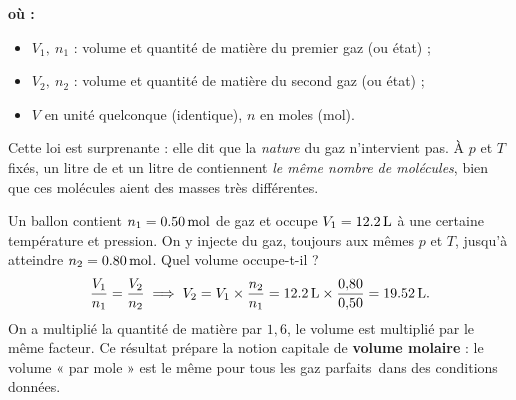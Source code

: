 \documentclass[11pt,a4paper]{article}
\newenvironment{ou}{%
  \par\smallskip\noindent\textbf{où :}\nopagebreak
  \begin{itemize}[leftmargin=1.8em,topsep=2pt,itemsep=1.5pt,parsep=0pt]}%
  {\end{itemize}}
\newcommand{\GP}{gaz parfaits}
\begin{document}
\begin{ou}
  \item $V_1,\ n_1$ : volume et quantité de matière du premier gaz (ou état) ;
  \item $V_2,\ n_2$ : volume et quantité de matière du second gaz (ou état) ;
  \item $V$ en unité quelconque (identique), $n$ en moles (\si{\mole}).
\end{ou}

\noindent Cette loi est surprenante : elle dit que la \emph{nature} du gaz n'intervient pas. À $p$ et
$T$ fixés, un litre de  et un litre de  contiennent \emph{le même nombre de molécules},
bien que ces molécules aient des masses très différentes.

\begin{center}
\end{center}

\begin{exemple}
Un ballon contient $n_1=\qty{0{,}50}{\mole}$ de gaz et occupe $V_1=\qty{12{,}2}{\litre}$ à une
certaine température et pression. On y injecte du gaz, toujours aux mêmes $p$ et $T$, jusqu'à atteindre
$n_2=\qty{0{,}80}{\mole}$. Quel volume occupe-t-il ?
\[ \frac{V_1}{n_1}=\frac{V_2}{n_2}
   \;\Longrightarrow\;
   V_2 = V_1\times\frac{n_2}{n_1}
       = \qty{12{,}2}{\litre}\times\frac{0{,}80}{0{,}50}
       = \qty{19{,}52}{\litre}. \]
On a multiplié la quantité de matière par $1{,}6$, le volume est multiplié par le même facteur. Ce
résultat prépare la notion capitale de \textbf{volume molaire} : le volume « par mole » est le même
pour tous les \GP\ dans des conditions données.
\end{exemple}
\end{document}
